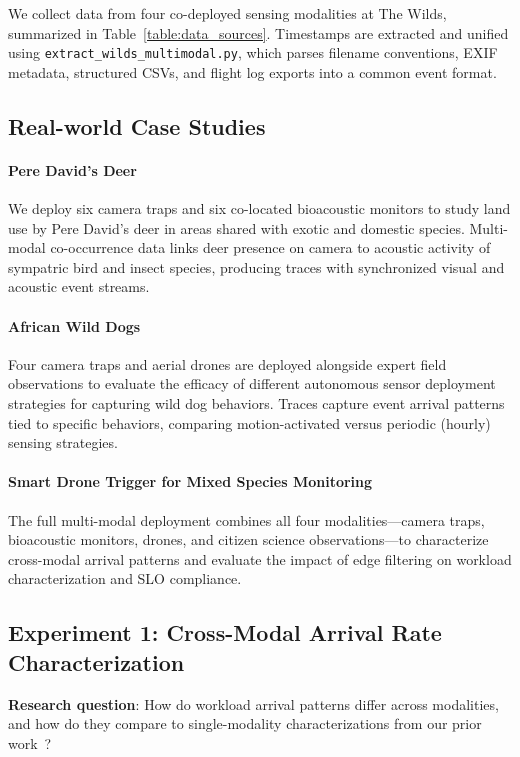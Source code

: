 \documentclass[letterpaper,twocolumn,10pt]{article}
\begin{document}
We collect data from four co-deployed sensing modalities at The Wilds, summarized in Table~\ref{table:data_sources}. Timestamps are extracted and unified using \texttt{extract\_wilds\_multimodal.py}, which parses filename conventions, EXIF metadata, structured CSVs, and flight log exports into a common event format.

\subsection{Real-world Case Studies}
\paragraph{Pere David’s Deer}
We deploy six camera traps and six co-located bioacoustic monitors to study land use by Pere David’s deer in areas shared with exotic and domestic species. Multi-modal co-occurrence data links deer presence on camera to acoustic activity of sympatric bird and insect species, producing traces with synchronized visual and acoustic event streams.

\paragraph{African Wild Dogs}
Four camera traps and aerial drones are deployed alongside expert field observations to evaluate the efficacy of different autonomous sensor deployment strategies for capturing wild dog behaviors. Traces capture event arrival patterns tied to specific behaviors, comparing motion-activated versus periodic (hourly) sensing strategies.

\paragraph{Smart Drone Trigger for Mixed Species Monitoring}
The full multi-modal deployment combines all four modalities---camera traps, bioacoustic monitors, drones, and citizen science observations---to characterize cross-modal arrival patterns and evaluate the impact of edge filtering on workload characterization and SLO compliance.

\subsection{Experiment 1: Cross-Modal Arrival Rate Characterization}
\label{sec:exp1}

\textbf{Research question}: How do workload arrival patterns differ across modalities, and how do they compare to single-modality characterizations from our prior work~\cite{kline2024characterizing}?
\end{document}
